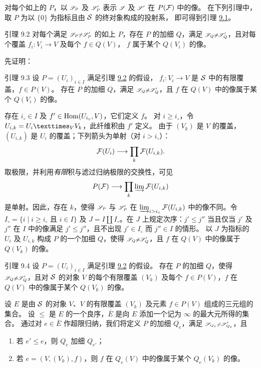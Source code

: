 对每个如上的 $P$，以 $\ss_P$ 及 $\ss'_P$ 表示 $\ss$ 及 $\ss'$ 在 $P(\Ff)$ 中的像。
在下列引理中，取 $P$ 为以 $\{0\}$ 为指标且由 $\Ss$ 的终对象构成的投射系，
即可得到引理 \hyperref[VI.lem9.1]{9.1}。

\begin{enonce*}{引理 9.2}
对每个满足 $\ss_P\ne\ss'_P$ 的如上 $P$，存在 $P$ 的加细 $Q$，满足
$\ss_Q\ne\ss'_Q$，且对每个覆盖 $f_i:V_i\to V$ 及每个 $f\in Q(V)$，
$f$ 属于某个 $Q(V_i)$ 的像。
\end{enonce*}

先证明：

\begin{enonce*}{引理 9.3}
设 $P=(U_i)_{i\in I}$ 满足引理 \hyperref[VI.lem9.2]{9.2} 的假设，
$f_i:V_i\to V$ 是 $\Ss$ 中的有限覆盖，$f\in P(V)$。
存在 $P$ 的加细 $Q$，满足 $\ss_Q\ne\ss'_Q$，且 $f$ 在 $Q(V)$ 中的像属于某个
$Q(V_i)$ 的像。
\end{enonce*}

存在 $i_{\circ}\in I$ 及 $f'\in\Hom(U_{i_{\circ}},V)$，它们定义 $f$。
对 $i\geq i_{\circ}$，令 $U_{i,k}=\fprod{U_i}{V_k}{V}$，此纤维积由 $f'$ 定义。
由于 $(V_k)$ 是 $V$ 的覆盖，$(U_{i,k})$ 是 $U_i$ 的覆盖；下列箭头为单射（对 $i>i_{\circ}$）：
$$
\Ff(U_i)\to\prod_k\Ff(U_{i,k}).
$$
取\pageoriginale{}极限，并利用\emph{有限}积与滤过归纳极限的交换性，可见
$$
P(\Ff)\to\prod_k\varinjlim\Ff(U_{i,k})
$$
是单射。因此，存在 $k$，使得 $\ss_P$ 与 $\ss'_P$ 在
$\varinjlim_{i>i_{\circ}}\Ff(U_{i,k})$ 中的像不同。令
$I_{\circ}=\{i\mid i\geq i_{\circ}\text{ 且 }i\in I\}$ 及
$J=I\coprod I_{\circ}$。在 $J$ 上规定次序：$j'\leq j''$ 当且仅当
$j'$ 及 $j''$ 在 $I$ 中的像满足 $j'\leq j''$，且不出现 $j'\in I_{\circ}$ 而 $j''\in I$ 的情形。
以 $J$ 为指标的 $U_i$ 及 $U_{i,k}$ 构成 $P$ 的一个加细 $Q$，使得
$\ss_Q\ne\ss'_Q$，且 $f$ 在 $Q(V)$ 中的像属于 $Q(V_k)$ 的像。

\begin{enonce*}{引理 9.4}
设 $P=(U_i)_{i\in I}$ 满足引理 \hyperref[VI.lem9.2]{9.2} 的假设。
存在 $P$ 的加细 $Q$，使得 $\ss_Q\ne\ss'_Q$，且对 $\Ss$ 的对象 $V$ 的每个有限覆盖
$(V_k)$ 及每个 $f\in P(V)$，$f$ 在 $Q(V)$ 中的像属于某个 $Q(V_k)$ 的像。
\end{enonce*}

设 $E$ 是由 $\Ss$ 的对象 $V$、$V$ 的有限覆盖 $(V_k)$ 及元素 $f\in P(V)$ 组成的三元组的集合。
设 $\leq$ 是 $E$ 的一个良序，$\bar E$ 是向 $E$ 添加一个记为 $\infty$ 的最大元所得的集合。
通过对 $e\in\bar E$ 作超限归纳，我们将定义 $P$ 的加细 $Q_e$，满足
$\ss_{Q_e}\ne\ss'_{Q_e}$，且
\begin{enumerate}
\renewcommand{\theenumi}{\roman{enumi}}
\renewcommand{\labelenumi}{(\theenumi)}
\item 若 $e'\leq e$，则 $Q_e$ 加细 $Q_{e'}$；

\item 若 $e=(V,(V_k),f)$，则 $f$ 在 $Q_e(V)$ 中的像属于某个 $Q_e(V_k)$ 的像。
\end{enumerate}


